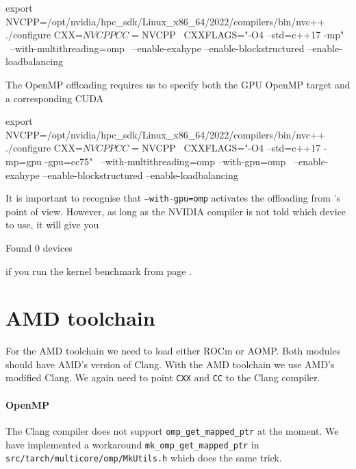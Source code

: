 \begin{bash}
export NVCPP=/opt/nvidia/hpc_sdk/Linux_x86_64/2022/compilers/bin/nvc++
./configure CXX=$NVCPP CC=$NVCPP \
 CXXFLAGS="-O4 --std=c++17 -mp" \
 --with-multithreading=omp \
 --enable-exahype --enable-blockstructured --enable-loadbalancing
\end{bash}

\noindent
The OpenMP offloading requires us to specify both the GPU OpenMP target and a
corresponding CUDA 


\begin{bash}
export NVCPP=/opt/nvidia/hpc_sdk/Linux_x86_64/2022/compilers/bin/nvc++
./configure CXX=$NVCPP CC=$NVCPP \
 CXXFLAGS="-O4 --std=c++17 -mp=gpu -gpu=cc75" \
 --with-multithreading=omp --with-gpu=omp \
 --enable-exahype --enable-blockstructured --enable-loadbalancing
\end{bash}




\noindent
It is important to recognise that \texttt{--with-gpu=omp} activates the
offloading from \Peano's point of view. 
However, as long as the NVIDIA compiler is not told which device to use, it will
give you

\begin{terminalOutput}
Found 0 devices
\end{terminalOutput}

\noindent
if you run the kernel benchmark from page \pageref{page:exahype:kernel-benchmark}.


\section{AMD toolchain}
For the AMD toolchain we need to load either ROCm or AOMP.
Both modules should have AMD's version of Clang.
With the AMD toolchain we use AMD's modified Clang. We again need to point \texttt{CXX}
and \texttt{CC} to the Clang compiler.

\paragraph{OpenMP}
\begin{remark}
  The Clang compiler does not support \texttt{omp\_get\_mapped\_ptr} at the moment.
  We have implemented a workaround \texttt{mk\_omp\_get\_mapped\_ptr} in \texttt{src/tarch/multicore/omp/MkUtils.h}
  which does the same trick.
 \end{remark}

